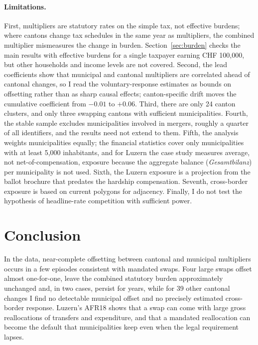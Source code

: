 \documentclass[11pt,a4paper]{article}
\begin{document}
\paragraph{Limitations.} First, multipliers are statutory rates on the simple tax, not effective burdens; where cantons change tax schedules in the same year as multipliers, the combined multiplier mismeasures the change in burden. Section~\ref{sec:burden} checks the main results with effective burdens for a single taxpayer earning CHF 100,000, but other households and income levels are not covered. Second, the lead coefficients show that municipal and cantonal multipliers are correlated ahead of cantonal changes, so I read the voluntary-response estimates as bounds on offsetting rather than as sharp causal effects; canton-specific drift moves the cumulative coefficient from $-0.01$ to $+0.06$. Third, there are only 24 canton clusters, and only three swapping cantons with sufficient municipalities. Fourth, the stable sample excludes municipalities involved in mergers, roughly a quarter of all identifiers, and the results need not extend to them. Fifth, the analysis weights municipalities equally; the financial statistics cover only municipalities with at least 5,000 inhabitants, and for Luzern the case study measures average, not net-of-compensation, exposure because the aggregate balance (\emph{Gesamtbilanz}) per municipality is not used. Sixth, the Luzern exposure is a projection from the ballot brochure that predates the hardship compensation. Seventh, cross-border exposure is based on current polygons for adjacency. Finally, I do not test the hypothesis of headline-rate competition with sufficient power.

\section{Conclusion}\label{sec:concl}

In the data, near-complete offsetting between cantonal and municipal multipliers occurs in a few episodes consistent with mandated swaps. Four large swaps offset almost one-for-one, leave the combined statutory burden approximately unchanged and, in two cases, persist for years, while for 39 other cantonal changes I find no detectable municipal offset and no precisely estimated cross-border response. Luzern's AFR18 shows that a swap can come with large gross reallocations of transfers and expenditure, and that a mandated reallocation can become the default that municipalities keep even when the legal requirement lapses.
\end{document}
